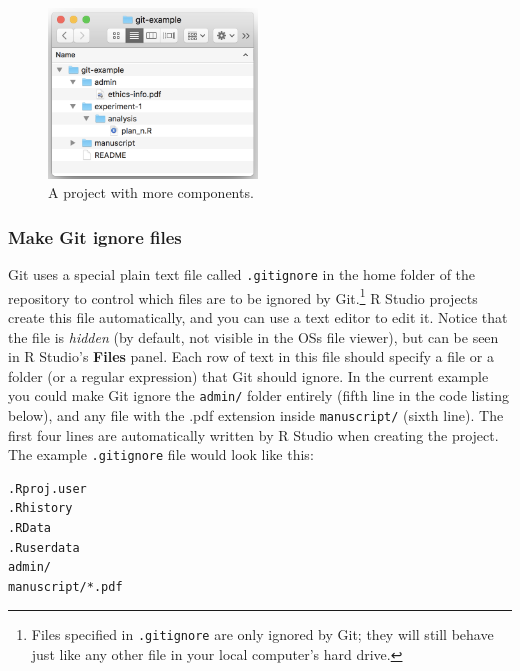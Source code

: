 \documentclass[
  american,
  ,doc,floatsintext]{apa6}
\begin{document}
\begin{figure}

{\centering \includegraphics[width=2.19in]{images/advanced-project} 

}

\caption{A project with more components.}\label{fig:advanced-project}
\end{figure}

\hypertarget{make-git-ignore-files}{%
\subsubsection{Make Git ignore files}\label{make-git-ignore-files}}

Git uses a special plain text file called \texttt{.gitignore} in the home folder of the repository to control which files are to be ignored by Git.\footnote{Files specified in \texttt{.gitignore} are only ignored by Git; they will still behave just like any other file in your local computer's hard drive.} R Studio projects create this file automatically, and you can use a text editor to edit it. Notice that the file is \emph{hidden} (by default, not visible in the OSs file viewer), but can be seen in R Studio's \textbf{Files} panel. Each row of text in this file should specify a file or a folder (or a regular expression) that Git should ignore. In the current example you could make Git ignore the \texttt{admin/} folder entirely (fifth line in the code listing below), and any file with the .pdf extension inside \texttt{manuscript/} (sixth line). The first four lines are automatically written by R Studio when creating the project. The example \texttt{.gitignore} file would look like this:

\begin{verbatim}
.Rproj.user
.Rhistory
.RData
.Ruserdata
admin/
manuscript/*.pdf
\end{verbatim}
\end{document}
